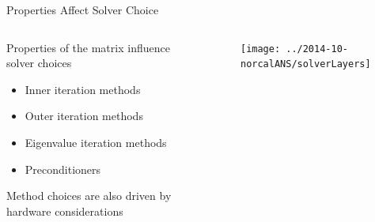 \documentclass[xcolor=x11names,compress]{beamer}
\renewcommand{\(}{\begin{columns}}
\renewcommand{\)}{\end{columns}}
\newcommand{\<}[1]{\begin{column}{#1}}
\renewcommand{\>}{\end{column}}
\begin{document}
\begin{frame}{Properties Affect Solver Choice}

    \begin{columns}
    \begin{column}{0.45\textwidth}
     
        \textcolor{dgreen}{Properties of the matrix} influence solver choices
        \begin{itemize}
        \item Inner iteration methods
        \item Outer iteration methods
        \item Eigenvalue iteration methods
        \item Preconditioners
        \end{itemize}
    
        Method choices are also driven by \textcolor{dgreen}{hardware} considerations
  	\end{column}
 	\begin{column}{0.45\textwidth}
 	   \begin{center}
 	   \begin{figure}
 	   \texttt{[image: ../2014-10-norcalANS/solverLayers]}
       \end{figure}
 	   \end{center}
  	\end{column}
	\end{columns}
	
\end{frame}
\end{document}
